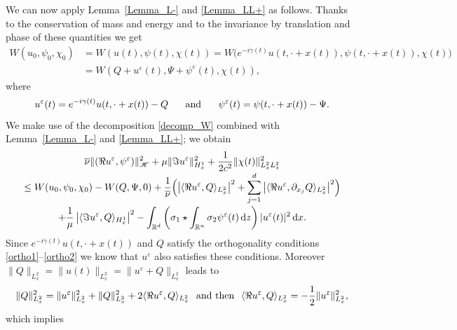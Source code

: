\documentclass[JEP,XML,SOM,NoEqCountersInSection,NoFloatCountersInSection,Unicode,published]{cedram}
\let\bar\oldbar
\theoremstyle{definition}
\let\bar\overline
\newcommand{\R}{\mathbb{R}}
\newcommand{\ud}{\, {\mathrm{d}}}
\begin{document}
We can now apply Lemma~\ref{Lemma_L-} and \ref{Lemma_LL+} as follows. Thanks to the conservation of mass and energy and
to the invariance by translation and phase of these quantities we get\vspace*{-3pt}
\begin{align*}
W(u_{0},\psi_{0},\chi_{0})&=W(u(t),\psi(t),\chi(t))
=W\bigl(e^{-i\gamma(t)}u(t,\cdot+x(t)),\psi(t,\cdot+x(t)),\chi(t)\bigr)\\
&=W(Q+u^{\varepsilon}(t),\Psi+\psi^{\varepsilon}(t),\chi(t)),
\end{align*}
where\vspace*{-5pt}
\[
u^{\varepsilon}(t)=e^{-i\gamma(t)}u(t,\cdot+x(t))-Q\hspace{0.5cm}\text{ and }\hspace{0.5cm}\psi^{\varepsilon}(t)=\psi(t,\cdot+x(t))-\Psi.
\]
We make use of the decomposition \eqref{decomp_W} combined with Lemma~\ref{Lemma_L-} and \ref{Lemma_LL+}; we obtain\vspace*{-5pt}
\begin{multline*}
\bar{\nu}\|(\Re u^{\varepsilon},\psi^{\varepsilon})\|_{\mathscr{H}}^{2}+\mu\|\Im u^{\varepsilon}\|_{H_{x}^{1}}^{2}+\frac{1}{2c^{2}}\|\chi(t)\|_{L_{x}^{2}L_{z}^{2}}^{2}\\[
-3pt]
\leq W(u_{0},\psi_{0},\chi_{0})-W(Q,\Psi,0)+\frac{1}{\bar{\nu}}\Bigl(\left|\langle \Re u^{\varepsilon},Q\rangle_{L_{x}^{2}}\right|^{2}+\sum_{j=1}^{d}\left|\langle \Re u^{\varepsilon},\partial_{x_{j}}Q\rangle_{L_{x}^{2}}\right|^{2}\Bigr)\\[
-2pt]
+\frac{1}{\mu}\left|\langle \Im u^{\varepsilon},Q\rangle_{H_{x}^{1}}\right|^{2}-\int_{\R^{d}}\left(\sigma_{1}\star\int_{\R^{n}}\sigma_{2}\psi^{\varepsilon}(t)\ud z\right)|u^{\varepsilon}(t)|^{2}\ud x.
\end{multline*}
Since $e^{-i\gamma(t)}u(t,\cdot+x(t))$ and $Q$ satisfy the orthogonality conditions \eqref{ortho1}--\eqref{ortho2} we know that $u^{\varepsilon}$ also satisfies these conditions. Moreover $\|Q\|_{L_{x}^{2}}=\|u(t)\|_{L_{x}^{2}}=\|u^{\varepsilon}+Q\|_{L_{x}^{2}}$ leads to\vspace*{-3pt}
\[
\|Q\|_{L_{x}^{2}}^{2}=\|u^{\varepsilon}\|_{L_{x}^{2}}^{2}+\|Q\|_{L_{x}^{2}}^{2}+2\langle\Re u^{\varepsilon},Q\rangle_{L_{x}^{2}} \hspace{0.25cm}\text{and then}\hspace{0.25cm} \langle\Re u^{\varepsilon},Q\rangle_{L_{x}^{2}}=-\frac{1}{2}\|u^{\varepsilon}\|_{L_{x}^{2}}^{2},
\]
which implies\vspace*{-3pt}
\end{document}
